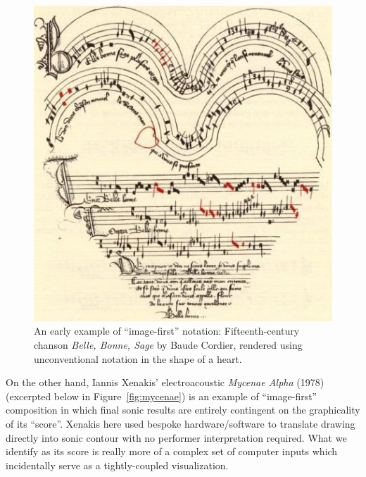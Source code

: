             \begin{figure} 
                \centering
                \includegraphics[width=.5\textwidth]{images/chapter2/bellebonnesage.jpg}
                \captionsetup{width=.5\textwidth}
                \caption[An early example of what might be considered ``image-first'' notation: Fifteenth-century chanson \textit{Belle, Bonne, Sage} by Baude Cordier, rendered using unconventional notation in the shape of a heart.]{An early example of ``image-first'' notation: Fifteenth-century chanson \textit{Belle, Bonne, Sage} by Baude Cordier, rendered using unconventional notation in the shape of a heart.\footnotemark}
                \label{fig:heart}
            \end{figure}
    
    \noindent On the other hand, Iannis Xenakis' electroacoustic \textit{Mycenae Alpha} (1978) (excerpted below in Figure~\ref{fig:mycenae}) is an example of ``image-first'' composition in which final sonic results are entirely contingent on the graphicality of its ``score''. Xenakis here used bespoke hardware/software to translate drawing directly into sonic contour with no performer interpretation required. What we identify as its score is really more of a complex set of computer inputs which incidentally serve as a tightly-coupled visualization.

